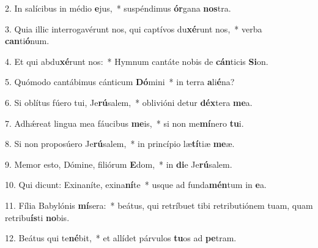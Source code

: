 2. In salícibus in médio \textbf{e}jus,~*  suspéndimus \textbf{ór}gana \textbf{nos}tra.\

3. Quia illic interrogavérunt nos, qui captívos du\textbf{xé}runt nos,~*  verba \textbf{can}ti\textbf{ó}num.\

4. Et qui abdu\textbf{xé}runt nos:~*  Hymnum cantáte nobis de \textbf{cán}ticis \textbf{Si}on.\

5. Quómodo cantábimus cánticum \textbf{Dó}mini~*  in terra \textbf{a}li\textbf{é}na?\

6. Si oblítus fúero tui, Je\textbf{rú}salem,~*  oblivióni detur \textbf{déx}tera \textbf{me}a.\

7. Adhǽreat lingua mea fáucibus \textbf{me}is,~*  si non me\textbf{mí}nero \textbf{tu}i.\

8. Si non proposúero Je\textbf{rú}salem,~*  in princípio læ\textbf{tí}tiæ \textbf{me}æ.\

9. Memor esto, Dómine, filiórum \textbf{E}dom,~*  in \textbf{di}e Je\textbf{rú}salem.\

10. Qui dicunt: Exinaníte, exina\textbf{ní}te~*  usque ad funda\textbf{mén}tum in \textbf{e}a.\

11. Fília Babylónis \textbf{mí}sera:~*  beátus, qui retríbuet tibi retributiónem tuam, quam retribu\textbf{ís}ti \textbf{no}bis.\

12. Beátus qui te\textbf{né}bit,~*  et allídet párvulos \textbf{tu}os ad \textbf{pe}tram.\

